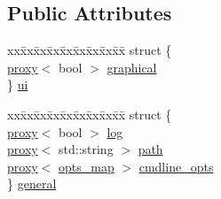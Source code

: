 \subsection*{Public Attributes}
\begin{DoxyCompactItemize}
\item 
\begin{tabbing}
xx\=xx\=xx\=xx\=xx\=xx\=xx\=xx\=xx\=\kill
struct \{\\
\>\hyperlink{class_configuration_1_1proxy}{proxy}$<$ bool $>$ \hyperlink{class_configuration_ae0dac8e1f3bc2060e62d0d3831ff8fd2}{graphical}\\
\} \hyperlink{class_configuration_a773fe8c81358ff346925ed7e761eb06f}{ui}\\

\end{tabbing}\item 
\begin{tabbing}
xx\=xx\=xx\=xx\=xx\=xx\=xx\=xx\=xx\=\kill
struct \{\\
\>\hyperlink{class_configuration_1_1proxy}{proxy}$<$ bool $>$ \hyperlink{class_configuration_a72f67f71506f13323e16d2b55306cf53}{log}\\
\>\hyperlink{class_configuration_1_1proxy}{proxy}$<$ std::string $>$ \hyperlink{class_configuration_ae06f5de56549c051253ffb15b61fc9e1}{path}\\
\>\hyperlink{class_configuration_1_1proxy}{proxy}$<$ \hyperlink{class_configuration_a70a439c19649766a6bb0f02656d1b7ce}{opts\_map} $>$ \hyperlink{class_configuration_a5007bea08dd20541536e2945d1d41d8f}{cmdline\_opts}\\
\} \hyperlink{class_configuration_a711d1d1f496fb0c1362c8922522a4fd6}{general}\\


\end{tabbing}
\end{DoxyCompactItemize}
